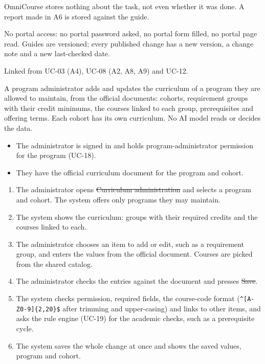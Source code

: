 OmniCourse stores nothing about the task, not even whether it was done. A report made in A6 is stored against the guide.

No portal access: no portal password asked, no portal form filled, no portal page read. Guides are versioned; every
published change has a new version, a change note and a new last-checked date.

Linked from UC-03 (A4), UC-08 (A2, A8, A9) and UC-12.


A program administrator adds and updates the curriculum of a program they are allowed to maintain, from the official
documents: cohorts, requirement groups with their credit minimums, the courses linked to each group, prerequisites and
offering terms. Each cohort has its own curriculum. No AI model reads or decides the data.

\begin{itemize}
  \item The administrator is signed in and holds program-administrator permission for the program (UC-18).
  \item They have the official curriculum document for the program and cohort.
\end{itemize}

\begin{enumerate}
  \item The administrator opens \st{Curriculum administration} and selects a program and cohort. The system offers only
        programs they may maintain.
  \item The system shows the curriculum: groups with their required credits and the courses linked to each.
  \item The administrator chooses an item to add or edit, such as a requirement group, and enters the values from the
        official document. Courses are picked from the shared catalog.
  \item The administrator checks the entries against the document and presses \st{Save}.
  \item The system checks permission, required fields, the course-code format (\texttt{\^{}[A-Z0-9]\{2,20\}\$} after
        trimming and upper-casing) and links to other items, and asks the rule engine (UC-19) for the academic checks, such
        as a prerequisite cycle.
  \item The system saves the whole change at once and shows the saved values, program and cohort.
\end{enumerate}


